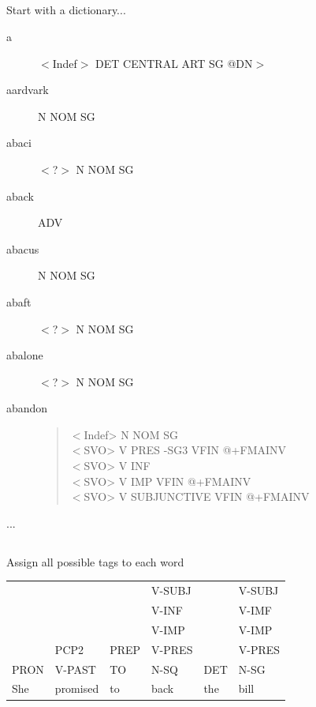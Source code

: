 \documentclass[9pt,xcolor=pdftex,dvipsnames,table]{beamer}
\begin{document}
\subsection{}
\begin{frame}{Start with a dictionary...}

	\begin{description}
		\item[a] $<$Indef$>$ DET CENTRAL ART SG @DN$>$
		\item[aardvark] N NOM SG 
		\item[abaci] $<$?$>$ N NOM SG
		\item[aback] ADV
		\item[abacus] N NOM SG 
		\item[abaft] $<$?$>$ N NOM SG
		\item[abalone] $<$?$>$ N NOM SG
		\item[abandon] \begin{quote} $<$Indef> N NOM SG\\
	$<$SVO> V PRES -SG3 VFIN @+FMAINV\\
	$<$SVO> V INF\\
	$<$SVO> V IMP VFIN @+FMAINV\\
	$<$SVO> V SUBJUNCTIVE VFIN @+FMAINV\end{quote}
		\item[...]
	\end{description}
\end{frame}

\subsection{}
\begin{frame}{Assign all possible tags to each word}

\begin{center}

\begin{tabular}{l l l l l l}
     &          &      & V-SUBJ &     & V-SUBJ \\
     &          &      & V-INF  &     & V-IMF \\
     &          &      & V-IMP  &     & V-IMP \\
     & PCP2     & PREP & V-PRES &     & V-PRES \\
PRON & V-PAST   & TO   & N-SQ   & DET & N-SG \\\hline
She  & promised & to   & back   & the & bill\\
\end{tabular}
\end{center}
\end{frame}
\end{document}
